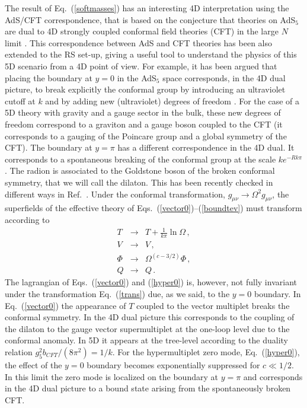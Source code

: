 \documentclass[a4paper,12pt]{article}
\begin{document}
The result of Eq.~(\ref{softmasses})
has an interesting 4D interpretation using
the  AdS/CFT correspondence, that is based on the conjecture
that theories on  AdS$_5$ are dual
to 4D strongly coupled conformal field theories (CFT) 
  in the large $N$ limit \cite{maldacena}.
This correspondence between AdS and CFT theories 
has been also extended 
to the RS set-up,
giving a useful tool to understand the physics of 
this 5D scenario from a 4D point of view.
For example, it has been argued that 
placing the     boundary at $y=0$ 
in the 
AdS$_5$ space corresponds,
in the 4D dual picture, to break explicitly the conformal group
by introducing an ultraviolet cutoff at $k$ and 
by adding new (ultraviolet) degrees of freedom \cite{gu}.
For the case of a 5D theory with gravity and a gauge sector in
the bulk, 
these new degrees of freedom correspond to a graviton and 
a gauge boson coupled to the CFT (it corresponds
to a gauging of the Poincare group and a global symmetry of the CFT).
The
boundary at  $y=\pi$ has a different correspondence in the
4D dual.
It  corresponds
to a spontaneous breaking 
of the conformal group 
at the scale $ke^{-Rk\pi}$. 
The radion is associated to the
 Goldstone boson of the broken conformal symmetry, 
that we will call the dilaton.
This has been recently checked in  different ways in Ref.~\cite{arp}.
Under the conformal transformation, 
$g_{\mu\nu}\rightarrow \Omega^2 g_{\mu\nu}$,
the superfields 
of the effective theory 
of Eqs.~(\ref{vector0})--(\ref{boundtev}) 
must transform 
according to
\begin{eqnarray}
T&\rightarrow& T+\frac{1}{k\pi}\ln\Omega\, ,\nonumber\\
V&\rightarrow& V\, ,\nonumber\\
\Phi &\rightarrow& \Omega^{(c-3/2)}\Phi\, ,\nonumber\\
Q&\rightarrow& Q\, .
\label{trans}
\end{eqnarray}
The lagrangian  of Eqs.~(\ref{vector0}) 
and (\ref{hyper0})
is, however,  not fully invariant under the transformation
Eq.~(\ref{trans}) due, as we said,  
to the  $y=0$ boundary.
In Eq.~(\ref{vector0}) 
the appearance  of $T$ coupled to the vector multiplet
breaks the conformal symmetry.
In the 4D dual picture this corresponds to 
the coupling of  the dilaton  to the gauge vector supermultiplet
at the one-loop level due to the conformal anomaly.
In 5D it appears at 
the tree-level according to the 
duality relation \cite{arp}
$g^2_5b_{CFT}/(8\pi^2)=1/k$.
For the hypermultiplet zero mode, Eq.~(\ref{hyper0}),
the effect of the 
$y=0$ boundary
becomes exponentially suppressed 
for $c\ll 1/2$. In this limit the zero mode
is localized on the  boundary at $y=\pi$ and 
corresponds in the 4D dual picture to a bound state arising from the 
spontaneously broken CFT.
\end{document}
